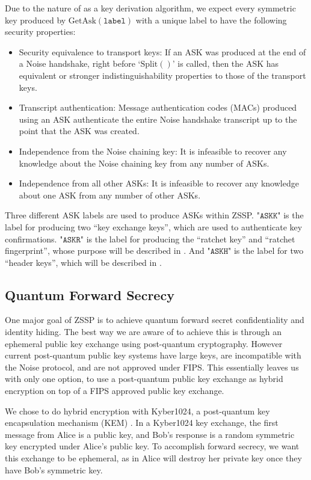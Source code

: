 \documentclass{article}
\begin{document}
Due to the nature of  as a key derivation algorithm, we expect every symmetric key produced by $\text{GetAsk}(\texttt{label})$ with a unique label to have the following security properties:
\begin{itemize}
	\item Security equivalence to transport keys: If an ASK was produced at the end of a Noise handshake, right before `$\text{Split}()$' is called, then the ASK has equivalent or stronger indistinguishability properties to those of the transport keys.
	\item Transcript authentication: Message authentication codes (MACs) produced using an ASK authenticate the entire Noise handshake transcript up to the point that the ASK was created.
	\item Independence from the Noise chaining key: It is infeasible to recover any knowledge about the Noise chaining key from any number of ASKs.
	\item Independence from all other ASKs: It is infeasible to recover any knowledge about one ASK from any number of other ASKs.
\end{itemize}

Three different ASK labels are used to produce ASKs within ZSSP. $\texttt{"ASKK"}$ is the label for producing two ``key exchange keys'', which are used to authenticate key confirmations. $\texttt{"ASKR"}$ is the label for producing the ``ratchet key'' and ``ratchet fingerprint'', whose purpose will be described in . And $\texttt{"ASKH"}$ is the label for two ``header keys'', which will be described in .

\subsection{Quantum Forward Secrecy}

One major goal of ZSSP is to achieve quantum forward secret confidentiality and identity hiding. The best way we are aware of to achieve this is through an ephemeral public key exchange using post-quantum cryptography. However current post-quantum public key systems have large keys, are incompatible with the Noise protocol, and are not approved under FIPS. This essentially leaves us with only one option, to use a post-quantum public key exchange as hybrid encryption on top of a FIPS approved public key exchange.

We chose to do hybrid encryption with Kyber1024, a post-quantum key encapsulation mechanism (KEM) \cite{kyber}. In a Kyber1024 key exchange, the first message from Alice is a public key, and Bob's response is a random symmetric key encrypted under Alice's public key. To accomplish forward secrecy, we want this exchange to be ephemeral, as in Alice will destroy her private key once they have Bob's symmetric key.
\end{document}

